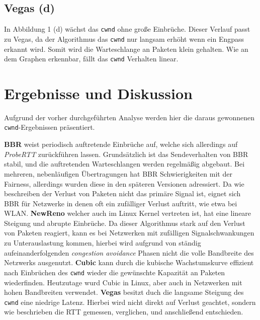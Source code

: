 \documentclass[paper=a4,fontsize=12pt,ngerman]{scrartcl}
\begin{document}
\subsection*{Vegas (d)}

In Abbildung 1 (d) wächst das \texttt{cwnd} ohne große Einbrüche. Dieser Verlauf passt zu Vegas, da der Algorithmus 
das \texttt{cwnd} nur langsam erhöht wenn ein Engpass erkannt wird. Somit wird die Warteschlange an Paketen klein gehalten.
Wie an dem Graphen erkennbar, fällt das \texttt{cwnd} Verhalten linear.


\section{Ergebnisse und Diskussion}
Aufgrund der vorher durchgeführten Analyse werden hier die daraus gewonnenen \texttt{cwnd}-Ergebnissen präsentiert. 

\textbf{BBR} weist periodisch auftretende Einbrüche auf, welche sich allerdings auf \textit{ProbeRTT} zurückführen lassen.
Grundsätzlich ist das Sendeverhalten von BBR stabil, und die auftretenden Warteschlangen werden regelmäßig abgebaut.
Bei mehreren, nebenläufigen Übertragungen hat BBR Schwierigkeiten mit der Fairness, allerdings wurden diese in den späteren
Versionen adressiert. Da wie beschreiben der Verlust von Paketen nicht das primäre Signal ist, eignet sich BBR für 
Netzwerke in denen oft ein zufälliger Verlust auftritt, wie etwa bei WLAN. \newline
\textbf{NewReno} welcher auch im Linux Kernel vertreten ist, hat eine lineare Steigung und abrupte Einbrüche.
Da dieser Algorithmus stark auf den Verlust von Paketen reagiert, kann es bei Netzwerken mit zufälligen Signalschwankungen
zu Unterauslastung kommen, hierbei wird aufgrund von ständig aufeinanderfolgenden \textit{congestion avoidance} Phasen
nicht die volle Bandbreite des Netzwerks ausgenutzt. \newline
\textbf{Cubic} kann durch die kubische Wachstumskurve effizient nach Einbrüchen des \texttt{cwnd} wieder die gewünschte 
Kapazität an Paketen wiederfinden. Heutzutage wurd Cubic in Linux, aber auch in Netzwerken mit hohen Bandbreiten verwendet.\cite{pandorafms} \newline
\textbf{Vegas} besitzt duch die langsame Steigung des \texttt{cwnd} eine niedrige Latenz.
Hierbei wird nicht direkt auf Verlust geachtet, sondern wie beschrieben die RTT gemessen, verglichen, und anschließend entschieden.
\end{document}
